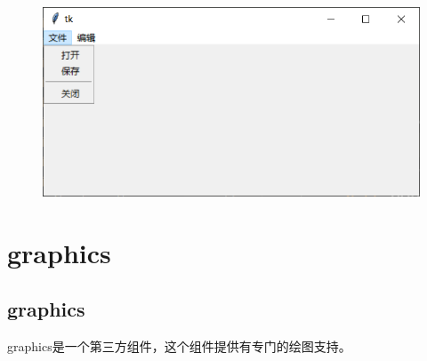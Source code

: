 \begin{tcolorbox}
	\begin{figure}[H]
		\centering
		\includegraphics[]{img/C13/13-4/6.png}
	\end{figure}
\end{tcolorbox}

\newpage

\section{graphics}

\subsection{graphics}

graphics是一个第三方组件，这个组件提供有专门的绘图支持。\\


